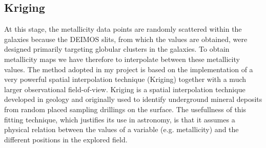 	\subsection{Kriging}
	At this stage, the metallicity data points are randomly scattered within the galaxies because the DEIMOS slits, 
	from which the values are obtained, were designed primarily targeting globular 
	clusters in the galaxies. 
	To obtain metallicity maps we have therefore to interpolate between these metallicity values.
    The method adopted in my project is based on the implementation of a very powerful spatial interpolation technique 
    (Kriging) together with a much larger observational field-of-view. 
	Kriging is a spatial interpolation technique developed in geology \citep{Krige51} and originally used to identify 
	underground mineral deposits from random placed sampling drillings on the surface.	
	The usefullness of this fitting technique, which justifies its use in astronomy, is that it assumes a physical relation 
	between the values of a variable (e.g. metallicity) and the different positions in the explored field. 
	
